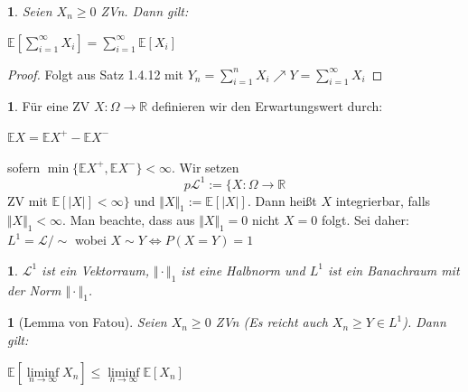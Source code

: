 \documentclass[10pt,a4paper]{report}
\numberwithin{equation}{section}
\numberwithin{figure}{section}
\theoremstyle{plain}
\theoremstyle{definition}
\newtheorem{defn}[thm]{\protect\definitionname}
\theoremstyle{remark}
\theoremstyle{plain}
\newtheorem{prop}[thm]{\protect\propositionname}
\newtheorem{cor}[thm]{\protect\corollaryname}
\providecommand{\corollaryname}{Korollar}
\providecommand{\definitionname}{Definition}
\providecommand{\propositionname}{Satz}
\newcommand{\1}{ \mathbb{1} } %
\begin{document}
\begin{cor}
  Seien $X_n \geq 0$ ZVn. Dann gilt:
  \begin{center}
    $\mathbb{E}[\sum\limits_{i=1}^\infty
    X_i]=\sum\limits_{i=1}^\infty\mathbb{E}[X_i]$
  \end{center}
\end{cor}
\begin{proof}
  Folgt aus Satz 1.4.12 mit $Y_n=\sum\limits_{i=1}^nX_i \nearrow Y= \sum\limits_{i=1}^\infty X_i$ 
\end{proof}
\begin{defn} 
  Für eine ZV $X:\Omega \to \mathbb{R}$ definieren wir den
  Erwartungswert durch:
  \begin{center}
    $\mathbb{E}X=\mathbb{E}X^+-\mathbb{E}X^-$
  \end{center}
  sofern $\min\{\mathbb{E}X^+,\mathbb{E}X^-\}<\infty$.
  Wir setzen
  \[p\mathcal{L}^1:=\{X:\Omega \to \mathbb{R}\] ZV mit $\mathbb{E}[|X|]< \infty \}$
  und $\Vert X\Vert_1:=\mathbb{E}[|X|]$. Dann heißt $X$ integrierbar, falls $\Vert X \Vert_1 < \infty$.
  Man beachte, dass aus $\Vert X \Vert_1=0$ nicht $X=0$ folgt. Sei daher:
  $L^1=\mathcal{L}/\sim$ wobei $X\sim Y \Leftrightarrow P(X=Y)=1$
\end{defn}
\begin{prop}
  $\mathcal{L}^1$ ist ein Vektorraum, $\Vert \cdot \Vert_1$ ist eine Halbnorm und $L^1$ ist ein Banachraum mit der Norm $\Vert \cdot \Vert_1$.
\end{prop}
\begin{prop}[Lemma von Fatou]
  Seien $X_n\geq 0$ ZVn (Es reicht auch $X_n \geq Y \in L^1$). Dann
  gilt:
  \begin{center}
    $\mathbb{E}[\liminf\limits_{n \to \infty} X_n]\leq
    \liminf\limits_{n \to \infty} \mathbb{E}[X_n]$
  \end{center}
\end{prop}
\end{document}
